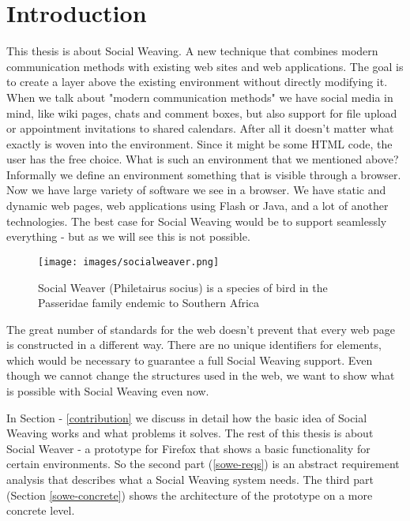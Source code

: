 \section{Introduction}

This thesis is about Social Weaving. A new technique that combines modern communication methods with existing web sites and web applications. The goal is to create a layer above the existing environment without directly modifying it. When we talk about "modern communication methods" we have social media in mind, like wiki pages, chats and comment boxes, but also support for file upload or appointment invitations to shared calendars. After all it doesn't matter what exactly is woven into the environment. Since it might be some HTML code, the user has the free choice. What is such an environment that we mentioned above? Informally we define an environment something that is visible through a browser. Now we have large variety of software we see in a browser. We have static and dynamic web pages, web applications using Flash or Java, and a lot of another technologies. The best case for Social Weaving would be to support seamlessly everything - but as we will see this is not possible.

\begin{figure}[!h]\centering
		\texttt{[image: images/socialweaver.png]}
		\caption{Social Weaver (Philetairus socius) is a species of bird in the Passeridae family endemic to Southern Africa}
		\label{socialweaver}
\end{figure} 

The great number of standards for the web doesn't prevent that every web page is constructed in a different way. There are no unique identifiers for elements, which would be necessary to guarantee a full Social Weaving support. Even though we cannot change the structures used in the web, we want to show what is possible with Social Weaving even now. 

In Section  - \ref{contribution} we discuss in detail how the basic idea of Social Weaving works and what problems it solves. The rest of this thesis is about Social Weaver - a prototype for Firefox that shows a basic functionality for certain environments. So the second part (\ref{sowe-reqs}) is an abstract requirement analysis that describes what a Social Weaving system needs. The third part (Section \ref{sowe-concrete}) shows the architecture of the prototype on a more concrete level.
